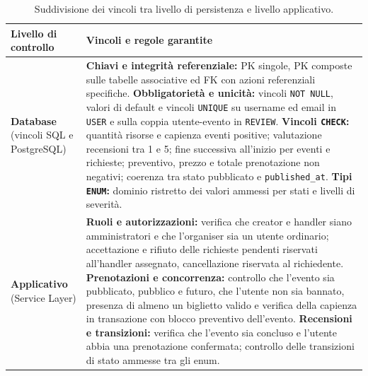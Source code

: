 \begin{table}[!htbp]
    \centering
    \renewcommand{\arraystretch}{1.25}
    \begin{tabular}{|p{}|p{}|}
        \hline
        \textbf{Livello di controllo} & \textbf{Vincoli e regole garantite} \\
        \hline
        \textbf{Database} \newline (vincoli SQL e PostgreSQL) &
        \textbf{Chiavi e integrità referenziale:} PK singole, PK composte sulle tabelle associative ed FK con azioni referenziali specifiche. \newline
        \textbf{Obbligatorietà e unicità:} vincoli \texttt{NOT NULL}, valori di default e vincoli \texttt{UNIQUE} su username ed email in \texttt{USER} e sulla coppia utente-evento in \texttt{REVIEW}. \newline
        \textbf{Vincoli \texttt{CHECK}:} quantità risorse e capienza eventi positive; valutazione recensioni tra 1 e 5; fine successiva all'inizio per eventi e richieste; preventivo, prezzo e totale prenotazione non negativi; coerenza tra stato pubblicato e \texttt{published\_at}. \newline
        \textbf{Tipi \texttt{ENUM}:} dominio ristretto dei valori ammessi per stati e livelli di severità. \\
        \hline
        \textbf{Applicativo} \newline (Service Layer) &
        \textbf{Ruoli e autorizzazioni:} verifica che creator e handler siano amministratori e che l'organiser sia un utente ordinario; accettazione e rifiuto delle richieste pendenti riservati all'handler assegnato, cancellazione riservata al richiedente. \newline
        \textbf{Prenotazioni e concorrenza:} controllo che l'evento sia pubblicato, pubblico e futuro, che l'utente non sia bannato, presenza di almeno un biglietto valido e verifica della capienza in transazione con blocco preventivo dell'evento. \newline
        \textbf{Recensioni e transizioni:} verifica che l'evento sia concluso e l'utente abbia una prenotazione confermata; controllo delle transizioni di stato ammesse tra gli enum. \\
        \hline
    \end{tabular}
    \caption{Suddivisione dei vincoli tra livello di persistenza e livello applicativo.}
    \label{tab:vincoli-db-app}
\end{table}

